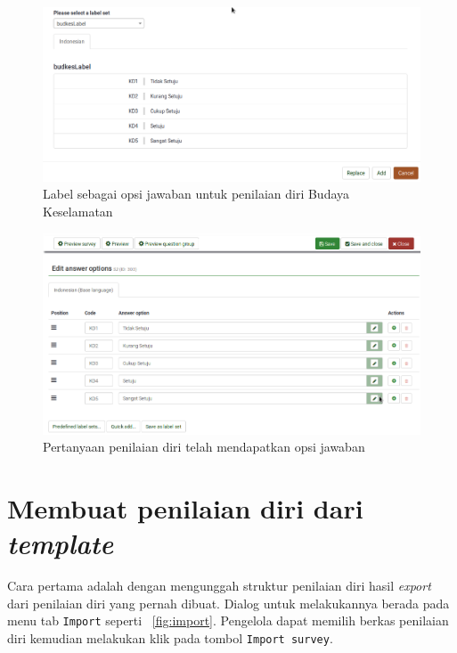 \begin{enumerate}
  \begin{figure}
    \begin{center}
      \includegraphics[scale=.5]{pics/labelSet1.png}
      \caption{Label sebagai opsi jawaban untuk penilaian diri Budaya Keselamatan}
      \label{fig:labelBudkes}
    \end{center}
  \end{figure}
  
  \begin{figure}
    \begin{center}
      \includegraphics[scale=.5]{pics/labelSet2.png}
      \caption{Pertanyaan penilaian diri telah mendapatkan opsi jawaban}
      \label{fig:labelBudkes1}
    \end{center}
  \end{figure}
\end{enumerate}

\section{Membuat penilaian diri dari \textit{template}}
Cara pertama adalah dengan mengunggah struktur penilaian diri hasil \textit{export} dari penilaian diri yang pernah dibuat. Dialog untuk melakukannya berada pada menu tab \texttt{Import} seperti \figurename~\ref{fig:import}. Pengelola dapat memilih berkas penilaian diri kemudian melakukan klik pada tombol \texttt{Import survey}.

